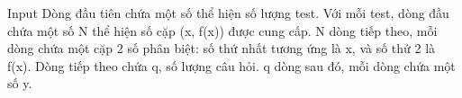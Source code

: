 Input
Dòng đầu tiên chứa một số thể hiện số lượng test. Với mỗi test, dòng đầu chứa một số N thể hiện số cặp (x, f(x)) được cung cấp. N dòng tiếp theo, mỗi dòng chứa một cặp 2 số phân biệt: số thứ nhất tương ứng là x, và số thứ 2 là f(x). Dòng tiếp theo chứa q, số lượng câu hỏi. q dòng sau đó, mỗi dòng chứa một số y.